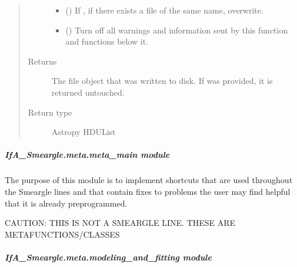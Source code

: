 \documentclass[letterpaper,10pt,english]{sphinxmanual}
\begin{document}
\begin{fulllineitems}
\begin{quote}
\begin{description}
\begin{itemize}
\item {} 
 (\sphinxstyleliteralemphasis{\sphinxupquote{ (}}\sphinxstyleliteralemphasis{\sphinxupquote{)}}) \textendash{} If , if there exists a file of the same name, overwrite.

\item {} 
 (\sphinxstyleliteralemphasis{\sphinxupquote{ (}}\sphinxstyleliteralemphasis{\sphinxupquote{)}}) \textendash{} Turn off all warnings and information sent by this function and
functions below it.

\end{itemize}

\item[{Returns}] \leavevmode
{} \textendash{} The file object that was written to disk. If  was
provided, it is returned untouched.

\item[{Return type}] \leavevmode
Astropy HDUList

\end{description}\end{quote}

\end{fulllineitems}



\subparagraph{IfA\_Smeargle.meta.meta\_main module}
\label{\detokenize{python_docstrings/IfA_Smeargle.meta.meta_main:module-IfA_Smeargle.meta.meta_main}}\label{\detokenize{python_docstrings/IfA_Smeargle.meta.meta_main:ifa-smeargle-meta-meta-main-module}}\label{\detokenize{python_docstrings/IfA_Smeargle.meta.meta_main::doc}}
The purpose of this module is to implement shortcuts that are used throughout the Smeargle
lines and that contain fixes to problems the user may find helpful that it is already
preprogrammed.

CAUTION: THIS IS NOT A SMEARGLE LINE. THESE ARE METAFUNCTIONS/CLASSES


\subparagraph{IfA\_Smeargle.meta.modeling\_and\_fitting module}
\label{\detokenize{python_docstrings/IfA_Smeargle.meta.modeling_and_fitting:module-IfA_Smeargle.meta.modeling_and_fitting}}\label{\detokenize{python_docstrings/IfA_Smeargle.meta.modeling_and_fitting:ifa-smeargle-meta-modeling-and-fitting-module}}\label{\detokenize{python_docstrings/IfA_Smeargle.meta.modeling_and_fitting::doc}}
\end{document}
